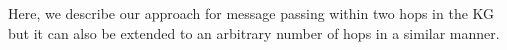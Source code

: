 





Here, we describe our approach for message passing within two hops in the KG but it can also be extended to an arbitrary number of hops in a similar manner.

